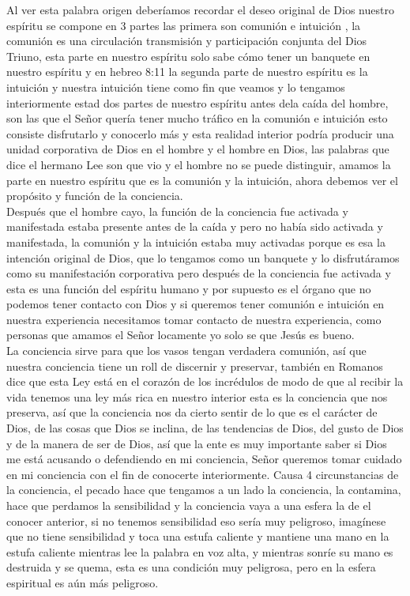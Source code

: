 \documentclass[12pt]{article}
\begin{document}
Al ver esta palabra origen deberíamos recordar el deseo original de Dios nuestro espíritu se compone en 3 partes las primera son comunión e intuición , la comunión es una circulación transmisión y participación conjunta del Dios Triuno, esta parte en nuestro espíritu solo sabe cómo tener un banquete en nuestro espíritu y en hebreo 8:11 la segunda parte de nuestro espíritu es la intuición y nuestra intuición tiene como fin que veamos y lo tengamos interiormente estad dos partes de nuestro espíritu antes dela caída del hombre, son las que el Señor quería tener mucho tráfico en la comunión e intuición esto consiste disfrutarlo y conocerlo más y esta realidad interior podría producir una unidad corporativa de Dios en el hombre y el hombre en Dios, las palabras que dice el hermano Lee son que vio y el hombre no se puede distinguir, amamos la parte en nuestro espíritu que es la comunión y la intuición, ahora debemos ver el propósito y función de la conciencia. \\

Después que el hombre cayo, la función de la conciencia fue activada y manifestada estaba presente antes de la caída y pero no había sido activada y manifestada, la comunión y la intuición estaba muy activadas porque es esa la intención original de Dios, que lo tengamos como un banquete y lo disfrutáramos como su manifestación corporativa pero después de la conciencia fue activada y esta es una función del espíritu humano y por supuesto es el órgano que no podemos tener contacto con Dios y si queremos tener comunión e intuición en nuestra experiencia necesitamos tomar contacto de nuestra experiencia, como personas que amamos el Señor locamente yo solo se que Jesús es bueno.\\

La conciencia sirve para que los vasos tengan verdadera comunión, así que nuestra conciencia tiene un roll de discernir y preservar, también en Romanos dice que esta Ley está en el corazón de los incrédulos de modo de que al recibir la vida tenemos una ley más rica en nuestro interior esta es la conciencia que nos preserva, así que la conciencia nos da cierto sentir de lo que es el carácter de Dios, de las cosas que Dios se inclina, de las tendencias de Dios, del gusto de Dios y de la manera de ser de Dios, así que la ente es muy importante saber si Dios me está acusando o defendiendo en mi conciencia, Señor queremos tomar cuidado en mi conciencia con el fin de conocerte interiormente. Causa 4 circunstancias de la conciencia, el pecado hace que tengamos a un lado la conciencia, la contamina, hace que perdamos la sensibilidad y la conciencia vaya a una esfera la de el conocer anterior, si no tenemos sensibilidad eso sería muy peligroso, imagínese que no tiene sensibilidad y toca una estufa caliente y mantiene una mano en la estufa caliente mientras lee la palabra en voz alta, y mientras sonríe su mano es destruida y se quema, esta es una condición muy peligrosa, pero en la esfera espiritual es aún más peligroso.\\
\end{document}
